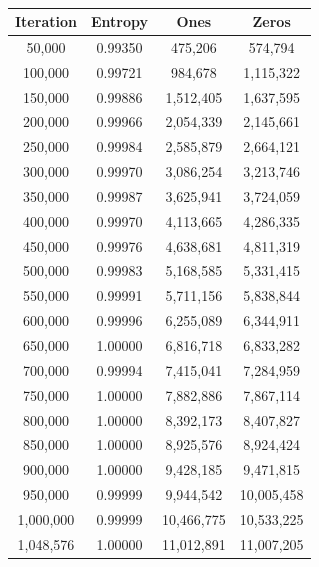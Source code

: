 \documentclass[letterpaper]{article}
\begin{document}
\begin{multicols}{2}
    \begin{table}[ht]
        \centering
        \begin{tabular}{|c|c|c|c|}
            \hline
            \textbf{Iteration} & \textbf{Entropy} & \textbf{Ones} & \textbf{Zeros} \\
            \hline
            50,000             & 0.99350          & 475,206       & 574,794        \\
            100,000            & 0.99721          & 984,678       & 1,115,322      \\
            150,000            & 0.99886          & 1,512,405     & 1,637,595      \\
            200,000            & 0.99966          & 2,054,339     & 2,145,661      \\
            250,000            & 0.99984          & 2,585,879     & 2,664,121      \\
            300,000            & 0.99970          & 3,086,254     & 3,213,746      \\
            350,000            & 0.99987          & 3,625,941     & 3,724,059      \\
            400,000            & 0.99970          & 4,113,665     & 4,286,335      \\
            450,000            & 0.99976          & 4,638,681     & 4,811,319      \\
            500,000            & 0.99983          & 5,168,585     & 5,331,415      \\
            550,000            & 0.99991          & 5,711,156     & 5,838,844      \\
            600,000            & 0.99996          & 6,255,089     & 6,344,911      \\
            650,000            & 1.00000          & 6,816,718     & 6,833,282      \\
            700,000            & 0.99994          & 7,415,041     & 7,284,959      \\
            750,000            & 1.00000          & 7,882,886     & 7,867,114      \\
            800,000            & 1.00000          & 8,392,173     & 8,407,827      \\
            850,000            & 1.00000          & 8,925,576     & 8,924,424      \\
            900,000            & 1.00000          & 9,428,185     & 9,471,815      \\
            950,000            & 0.99999          & 9,944,542     & 10,005,458     \\
            1,000,000          & 0.99999          & 10,466,775    & 10,533,225     \\
            1,048,576          & 1.00000          & 11,012,891    & 11,007,205     \\
            \hline
        \end{tabular}
        \caption{}
    \end{table}


\end{multicols}
\end{document}
